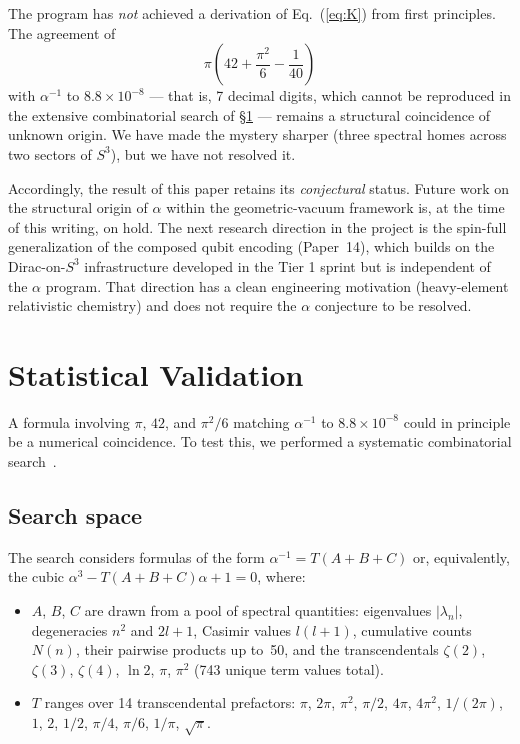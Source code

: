 \documentclass[aps,prl,twocolumn,superscriptaddress]{revtex4-2}
\begin{document}
The program has \emph{not} achieved a derivation of Eq.~(\ref{eq:K})
from first principles. The agreement of
\begin{equation}
  \pi\!\left(42 + \frac{\pi^{2}}{6} - \frac{1}{40}\right)
\end{equation}
with $\alpha^{-1}$ to $8.8 \times 10^{-8}$ — that is, 7 decimal digits,
which cannot be reproduced in the extensive combinatorial search of
\S\ref{sec:statistical} — remains a structural coincidence of unknown
origin. We have made the mystery sharper (three spectral homes across
two sectors of $S^{3}$), but we have not resolved it.

Accordingly, the result of this paper retains its \emph{conjectural}
status. Future work on the structural origin of $\alpha$ within the
geometric-vacuum framework is, at the time of this writing, on hold.
The next research direction in the project is the spin-full
generalization of the composed qubit encoding (Paper~14), which builds
on the Dirac-on-$S^{3}$ infrastructure developed in the Tier 1 sprint
but is independent of the $\alpha$ program. That direction has a clean
engineering motivation (heavy-element relativistic chemistry) and does
not require the $\alpha$ conjecture to be resolved.


\section{Statistical Validation}\label{sec:statistical}

A formula involving $\pi$, $42$, and $\pi^2/6$ matching $\alpha^{-1}$
to $8.8 \times 10^{-8}$ could in principle be a numerical
coincidence. To test this, we performed a systematic combinatorial
search~\cite{phase2_audit}.

\subsection{Search space}

The search considers formulas of the form $\alpha^{-1} = T(A + B + C)$
or, equivalently, the cubic $\alpha^3 - T(A+B+C)\alpha + 1 = 0$,
where:
\begin{itemize}
\item $A$, $B$, $C$ are drawn from a pool of spectral quantities:
  eigenvalues $|\lambda_n|$, degeneracies $n^2$ and $2l+1$, Casimir
  values $l(l+1)$, cumulative counts $N(n)$, their pairwise products
  up to~50, and the transcendentals $\zeta(2)$, $\zeta(3)$, $\zeta(4)$,
  $\ln 2$, $\pi$, $\pi^2$ (743 unique term values total).
\item $T$ ranges over 14 transcendental prefactors: $\pi$, $2\pi$,
  $\pi^2$, $\pi/2$, $4\pi$, $4\pi^2$, $1/(2\pi)$, $1$, $2$,
  $1/2$, $\pi/4$, $\pi/6$, $1/\pi$, $\sqrt{\pi}$.
\end{itemize}
\end{document}
